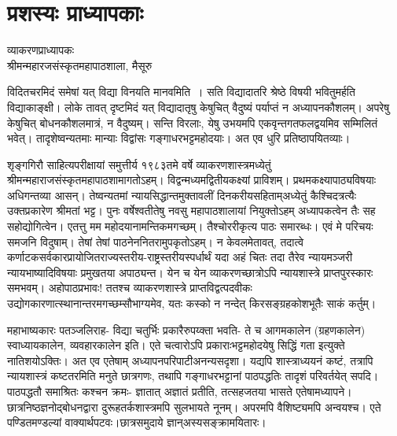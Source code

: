 {\fontsize{15}{17}\selectfont
\presetvalues
\chapter{प्रशस्यः प्राध्यापकाः}

\begin{center}
\smallskip
व्याकरणप्राध्यापकः\\
श्रीमन्महारजसंस्कृतमहापाठशाला, मैसूरु
\addrule
\end{center}
विदितचरमिदं समेषां यत् विद्या विनयति मानवमिति~। सति विद्यादातरि श्रेष्ठे विषयी भवितुमर्हति विद्याकाङ्क्षी।  लोके तावत् दृष्टमिदं यत् विद्यादातृषु केषुचित् वैदुष्यं पर्याप्तं न अध्यापनकौशलम्। अपरेषु केषुचित् बोधनकौशलमात्रं, न वैदुष्यम्। सन्ति विरलाः, येषु उभयमपि एकवृन्तगतफलद्वयमिव सम्मिलितं भवेत्। तादृशेष्वन्यतमाः मान्याः विद्वांसः गङ्गाधरभट्टमहोदयाः। अत एव धुरि प्रतिष्ठापयितव्याः।

शृङ्गगिरौ साहित्यपरीक्षायां समुत्तीर्य १९८३तमे वर्षे व्याकरणशास्त्रमध्येतुं श्रीमन्महाराजसंस्कृतमहापाठशामागतोऽहम्। विद्वन्मध्यमद्वितीयकक्ष्यां प्राविशम्। प्रथमकक्ष्यापाठ्य\-विषयाः अधिगन्तव्या आसन्। तेष्वन्यतमां न्यायसिद्धान्तमुक्तावलीं दिनकरीयसहिताम्\break अध्येतुं कैश्चिदत्रत्यैः उक्तप्रकारेण श्रीमतां भट्ट। पुनः वर्षेश्वतीतेषु नवसु महापाठ\-शालायां नियुक्तोऽहम् अध्यापकत्वेन तैः सह सहोद्योगित्वेन। एतत्तु मम महोदयानामन्तिकमगच्छम्। तैश्चोररीकृत्य पाठः समारब्धः। एवं मे परिचयः समजनि विदुषाम्। तेषां तेषां पाठनेन\break नितरामुपकृतोऽहम्। न केवलमेतावत्, तदात्वे कर्णाटकसर्वकारप्रायोजितराज्यस्तरीय-\break राष्ट्रस्तरीयस्पर्धार्थं यदा अहं चितः तदा तैरेव न्यायमञ्जरी न्यायभाष्यादिविषयाः प्रमुखतया अपाठ्यन्त। येन च येन व्याकरणच्छात्रोऽपि न्यायशास्त्रे प्राप्तपुरस्कारः समभवम्। अहो\break पाठप्रभावः! ततश्च व्याकरणशास्त्रे प्राप्तविद्वत्पदवीकः उद्योगकारणात्\break स्थानान्तरमगच्छम्सौभाग्यमेव, यतः कस्को न नन्देत् किरसङ्ग्रहकोशभूतैः साकं कर्तुम्।

महाभाष्यकारः पतञ्जलिराह- विद्या चतुर्भिः प्रकारैरुपय्क्ता भवति- ते च आगम\-कालेन (ग्रहणकालेन) स्वाध्यायकालेन, व्यवहारकालेन इति। एते चत्वारोऽपि प्रकाराः\break भट्टमहोदयेषु सिद्धिं गता इत्युक्ते नातिशयोऽक्तिः। अत एव एतेषाम् अध्यापनपरिपाटी\break अनन्यसदृशा। यद्यपि शास्त्राध्ययनं कष्टं, तत्रापि न्यायशास्त्रं कष्टतरमिति मनुते छात्रगणः, तथापि गङ्गाधरभट्टानां पाठपद्धतिः तादृशं परिवर्तयेत् सपदि। पाठपद्धतौ समाश्रितः कश्चन क्रमः- ज्ञातात् अज्ञातं प्रतीति, तत्सहजतया भासते एतेषामध्यापने। छात्रनिष्ठज्ञनोद्बोधनद्वारा दुरूहतर्कशास्त्रमपि सुलभायते नूनम्। अपरमपि वैशिष्ट्यमपि अन्वयश्च। एते पण्डितमण्डल्यां वाक्यार्थपटवः।छात्रसमुदाये ज्ञान्अस्यसङ्क्रामयितारः। 

}
